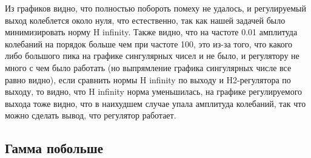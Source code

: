 Из графиков видно, что полностью побороть помеху не удалось, и регулируемый выход 
колеблется около нуля, что естественно, так как нашей задачей было минимизировать норму H infinity. 
Также видно, что на частоте 0.01 амплитуда колебаний на порядок больше чем при частоте 100,
это из-за того, что какого либо большого пика на графике сингулярных чисел и не было, и регулятору не много с чем было работать (но выпрямление графика сингулярных числе все равно видно), 
если сравнить нормы H infinity по выходу и H2-регулятора
по выходу, то видно, что H infinity норма уменьшилась, на графике регулируемого выхода тоже видно,
что в наихудшем случае упала амплитуда колебаний, так что можно сделать вывод, что регулятор
работает.


\subsection{Гамма побольше}

